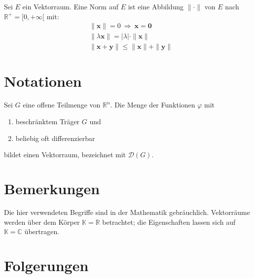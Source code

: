 \begin{definition}
	Sei $E$ ein Vektorraum. Eine Norm auf $E$ ist eine Abbildung
	$\|\cdot\|$ von $E$ nach $\mathbb{R}^+=[0,+\infty[$ mit:
	\begin{align}
		& \|\mathbf{x}\|=0 \ \Rightarrow\ \mathbf{x}=\mathbf{0} \\
		& \|\lambda \mathbf{x}\| = |\lambda|\cdot\|\mathbf{x}\| \\
		& \|\mathbf{x}+\mathbf{y}\| \leq \|\mathbf{x}\|+\|\mathbf{y}\|
	\end{align}
\end{definition}


\section{Notationen}

\begin{notation}
	Sei $G$ eine offene Teilmenge von $\mathbb{R}^n$. Die Menge der
	Funktionen $\varphi$ mit
	\begin{enumerate}
		\item beschränktem Träger $G$ und
		\item beliebig oft differenzierbar
	\end{enumerate}
	bildet einen Vektorraum, bezeichnet mit $\mathcal{D}(G)$.
\end{notation}


\section{Bemerkungen}

\begin{remark}
	Die hier verwendeten Begriffe sind in der Mathematik gebräuchlich.
	Vektorräume werden über dem Körper $\mathbb{K}=\mathbb{R}$ betrachtet;
	die Eigenschaften lassen sich auf $\mathbb{K}=\mathbb{C}$ übertragen.
\end{remark}


\section{Folgerungen}

